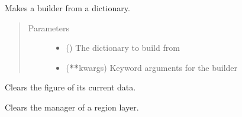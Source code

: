 \documentclass[letterpaper,10pt,english]{sphinxmanual}
\begin{document}
\begin{fulllineitems}
\begin{fulllineitems}
\label{\detokenize{builder:geohexviz.builder.PlotBuilder.builder_from_dict}}
\sphinxAtStartPar
Makes a builder from a dictionary.
\begin{quote}\begin{description}
\item[{Parameters}] \leavevmode\begin{itemize}
\item {} 
\sphinxAtStartPar
{} () \textendash{} The dictionary to build from

\item {} 
\sphinxAtStartPar
{} ({\color{red}\bfseries{}**}kwargs) \textendash{} Keyword arguments for the builder

\end{itemize}

\end{description}\end{quote}

\end{fulllineitems}


\begin{fulllineitems}
\label{\detokenize{builder:geohexviz.builder.PlotBuilder.clear_figure}}
\sphinxAtStartPar
Clears the figure of its current data.

\end{fulllineitems}


\begin{fulllineitems}
\label{\detokenize{builder:geohexviz.builder.PlotBuilder.clear_grid_manager}}
\sphinxAtStartPar
Clears the manager of a region layer.


\end{fulllineitems}
\end{fulllineitems}
\end{document}
